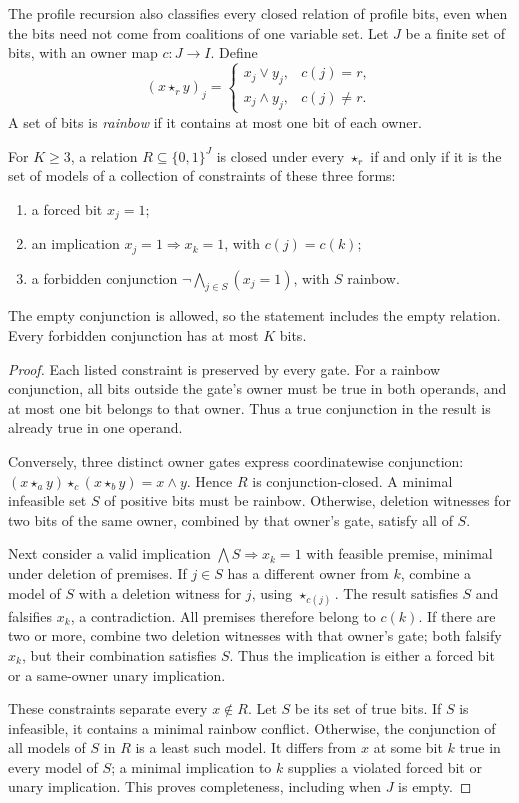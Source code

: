 The profile recursion also classifies every closed relation of profile bits,
even when the bits need not come from coalitions of one variable set.
Let $J$ be a finite set of bits, with an owner map $c:J\to I$. Define
\[
 (x\star_r y)_j=
 \begin{cases}x_j\lor y_j,&c(j)=r,\\
 x_j\land y_j,&c(j)\ne r.
 \end{cases}
\]
A set of bits is \emph{rainbow} if it contains at most one bit of each
owner.

\begin{theorem}\label{core:thm:profile-relations}
For $K\geq3$, a relation $R\subseteq\{0,1\}^J$ is closed under every
$\star_r$ if and only if it is the set of models of a collection of
constraints of these three forms:
\begin{enumerate}
\item a forced bit $x_j=1$;
\item an implication $x_j=1\Rightarrow x_k=1$, with $c(j)=c(k)$;
\item a forbidden conjunction $\neg\bigwedge_{j\in S}(x_j=1)$,
  with $S$ rainbow.
\end{enumerate}
The empty conjunction is allowed, so the statement includes the empty
relation. Every forbidden conjunction has at most $K$ bits.
\end{theorem}
\begin{proof}
Each listed constraint is preserved by every gate. For a rainbow
conjunction, all bits outside the gate's owner must be true in both
operands, and at most one bit belongs to that owner. Thus a true
conjunction in the result is already true in one operand.

Conversely, three distinct owner gates express coordinatewise conjunction:
$(x\star_a y)\star_c(x\star_b y)=x\land y$. Hence $R$ is
conjunction-closed. A minimal infeasible set $S$ of positive bits must be
rainbow. Otherwise, deletion witnesses for two bits of the same owner,
combined by that owner's gate, satisfy all of $S$.

Next consider a valid implication $\bigwedge S\Rightarrow x_k=1$ with
feasible premise, minimal under deletion of premises. If $j\in S$ has a
different owner from $k$, combine a model of $S$ with a deletion witness
for $j$, using $\star_{c(j)}$. The result satisfies $S$ and falsifies
$x_k$, a contradiction. All premises therefore belong to $c(k)$.
If there are two or more, combine two deletion witnesses with that
owner's gate; both falsify $x_k$, but their combination satisfies $S$.
Thus the implication is either a forced bit or a same-owner unary
implication.

These constraints separate every $x\notin R$. Let $S$ be its set of
true bits. If $S$ is infeasible, it contains a minimal rainbow conflict.
Otherwise, the conjunction of all models of $S$ in $R$ is a least such
model. It differs from $x$ at some bit $k$ true in every model of $S$;
a minimal implication to $k$ supplies a violated forced bit or unary
implication. This proves completeness, including when $J$ is empty.
\end{proof}

